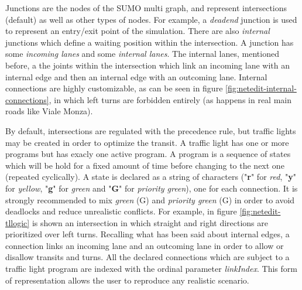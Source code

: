 
Junctions are the nodes of the SUMO multi graph, and represent intersections (default) as well as other types of nodes. For example, a \textit{deadend} junction is used to represent an entry/exit point of the simulation. There are also \textit{internal} junctions which define a waiting position within the intersection. A junction has some \textit{incoming lanes} and some \textit{internal lanes}. The internal lanes, mentioned before, a the joints within the intersection which link an incoming lane with an internal edge and then an internal edge with an outcoming lane. Internal connections are highly customizable, as can be seen in figure \ref{fig:netedit-internal-connections}, in which left turns are forbidden entirely (as happens in real main roads like Viale Monza).


By default, intersections are regulated with the precedence rule, but traffic lights may be created in order to optimize the transit. A traffic light has one or more programs but has exacly one active program. A program is a sequence of states which will be hold for a fixed amount of time before changing to the next one (repeated cyclically). A state is declared as a string of characters ("\textbf{r}" for \textit{red}, "\textbf{y}" for \textit{yellow}, "\textbf{g}" for \textit{green} and "\textbf{G}" for \textit{priority green}), one for each connection. It is strongly recommended to mix \textit{green} (G) and \textit{priority green} (G) in order to avoid deadlocks and reduce unrealistic conflicts. For example, in figure \ref{fig:netedit-tllogic} is shown an intersection in which straight and right directions are prioritized over left turns. Recalling what has been said about internal edges, a connection links an incoming lane and an outcoming lane in order to allow or disallow transits and turns. All the declared connections which are subject to a traffic light program are indexed with the ordinal parameter \textit{linkIndex}. This form of representation allows the user to reproduce any realistic scenario.

